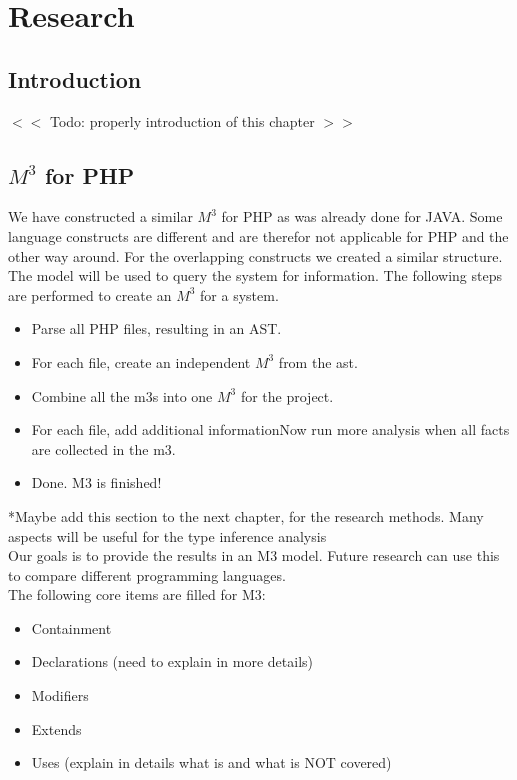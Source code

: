 \documentclass[../main.tex]{subfiles}
\begin{document}
    \chapter{Research}\label{chap:research}


    \section{Introduction}
    $<<$ Todo: properly introduction of this chapter $>>$
        
    
    \section{$M^3$ for PHP}
    We have constructed a similar $M^3$ for PHP as was already done for JAVA.
    Some language constructs are different and are therefor not applicable for PHP and the other way around.
    For the overlapping constructs we created a similar structure.
    The model will be used to query the system for information. %
    The following steps are performed to create an $M^3$ for a system.
    \begin{itemize}
        \item Parse all PHP files, resulting in an \gls{AST}.
        \item For each file, create an independent $M^3$ from the ast.
        \item Combine all the m3s into one $M^3$ for the project.
        \item For each file, add additional informationNow run more analysis when all facts are collected in the m3.
        \item Done. M3 is finished! 
    \end{itemize}

    \footnotesize{*Maybe add this section to the next chapter, for the research methods. Many aspects will be useful for the type inference analysis}
    \\
    Our goals is to provide the results in an M3 model.
    Future research can use this to compare different programming languages.
    \\ 
    The following core items are filled for M3:
    \begin{itemize}
        \item Containment
        \item Declarations (need to explain in more details)
        \item Modifiers
        \item Extends
        \item Uses (explain in details what is and what is NOT covered)
    \end{itemize}
    
\end{document}
